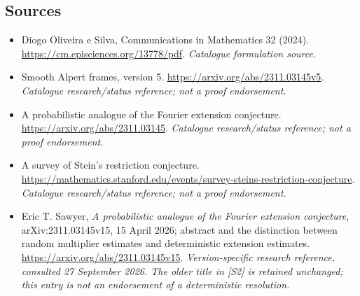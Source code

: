 \documentclass[11pt,a4paper]{article}
\numberwithin{equation}{section}
\begin{document}
\subsection{Sources}
\begin{itemize}\raggedright
\item[\textnormal{[S1]}]\hypertarget{source:30003539:1}{} Diogo Oliveira e Silva, Communications in Mathematics 32 (2024).
\url{https://cm.episciences.org/13778/pdf}.
{\small\textit{Catalogue formulation source.}}
\item[\textnormal{[S2]}]\hypertarget{source:30003539:2}{} Smooth Alpert frames, version 5.
\url{https://arxiv.org/abs/2311.03145v5}.
{\small\textit{Catalogue research/status reference; not a proof endorsement.}}
\item[\textnormal{[S3]}]\hypertarget{source:30003539:3}{} A probabilistic analogue of the Fourier extension conjecture.
\url{https://arxiv.org/abs/2311.03145}.
{\small\textit{Catalogue research/status reference; not a proof endorsement.}}
\item[\textnormal{[S4]}]\hypertarget{source:30003539:4}{} A survey of Stein's restriction conjecture.
\url{https://mathematics.stanford.edu/events/survey-steins-restriction-conjecture}.
{\small\textit{Catalogue research/status reference; not a proof endorsement.}}
\item[\textnormal{[E1]}]\hypertarget{extra:30003539:1}{} Eric T. Sawyer,
\emph{A probabilistic analogue of the Fourier extension conjecture},
arXiv:2311.03145v15, 15 April 2026; abstract and the distinction between
random multiplier estimates and deterministic extension estimates.
\url{https://arxiv.org/abs/2311.03145v15}.
{\small\textit{Version-specific research reference, consulted 27 September
2026. The older title in [S2] is retained unchanged; this entry is not an
endorsement of a deterministic resolution.}}
\end{itemize}
\end{document}
